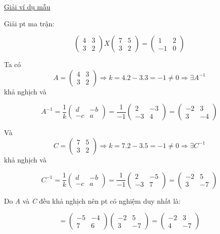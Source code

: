 \documentclass[
]{article}
\let\ul\uline
\begin{document}
\ul{Giải ví dụ mẫu}

Giải pt ma trận:

$$\begin{pmatrix} 4 & 3 \\ 3 & 2 \end{pmatrix} X \begin{pmatrix} 7 & 5 \\ 3 & 2 \end{pmatrix} = \begin{pmatrix} 1 & 2 \\ -1 & 0 \end{pmatrix}$$

Ta có $$A = \begin{pmatrix} 4 & 3 \\ 3 & 2 \end{pmatrix} \Rightarrow k = 4.2 - 3.3 = -1 \neq 0 \Rightarrow \exists A^{-1}$$ khả
nghịch và

$$A^{-1} = \frac{1}{k} \begin{pmatrix} d & -b \\ -c & a \end{pmatrix} = \frac{1}{-1} \begin{pmatrix} 2 & -3 \\ -3 & 4 \end{pmatrix} = \begin{pmatrix} -2 & 3 \\ 3 & -4 \end{pmatrix}$$

Và $$C = \begin{pmatrix} 7 & 5 \\ 3 & 2 \end{pmatrix} \Rightarrow k = 7.2 - 3.5 = -1 \neq 0 \Rightarrow \exists C^{-1}$$ khả nghịch
và

$$C^{-1} = \frac{1}{k} \begin{pmatrix} d & -b \\ -c & a \end{pmatrix} = \frac{1}{-1} \begin{pmatrix} 2 & -5 \\ -3 & 7 \end{pmatrix} = \begin{pmatrix} -2 & 5 \\ 3 & -7 \end{pmatrix}$$

Do \emph{A} và \emph{C} đều khả nghịch nên pt có nghiệm duy nhất là:

$$= \begin{pmatrix} -5 & -4 \\ 7 & 6 \end{pmatrix} \begin{pmatrix} -2 & 5 \\ 3 & -7 \end{pmatrix} = \begin{pmatrix} -2 & 3 \\ 4 & -7 \end{pmatrix}$$
\end{document}
